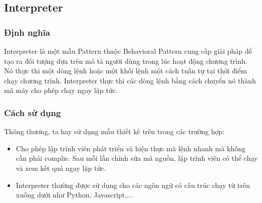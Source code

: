 \subsection{Interpreter}
\subsubsection{Định nghĩa}
Interpreter là một mẫu Pattern thuộc Behavioral Pattern cung cấp giải pháp để tạo ra đối tượng dựa trên mô tả người dùng trong lúc hoạt động chương trình. Nó thực thi một dòng lệnh hoặc một khối lệnh một cách tuần tự tại thời điểm chạy chương trình. Interpreter thực thi các dòng lệnh bằng cách chuyển nó thành mã máy cho phép chạy ngay lặp tức.
\subsubsection{Cách sử dụng}
Thông thương, ta hay sử dụng mẫu thiết kế trên trong các trường hợp:
\begin{itemize}
    \item Cho phép lập trình viên phát triển và hiện thực mã lệnh nhanh mà không cần phải complie. Sau mỗi lần chỉnh sửa mã nguồn, lập trình viên có thể chạy và xem kết quả ngay lặp tức.
    \item  Interpreter thường được sử dụng cho các ngôn ngữ có cấu trúc chạy từ trên xuống dưới như Python, Javascript,...
\end{itemize}
